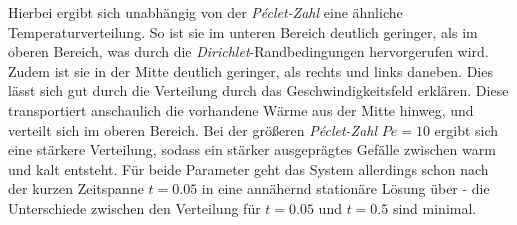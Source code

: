 \documentclass[12pt,a4paper,titlepage,headinclude,bibtotoc]{scrartcl}
\begin{document}
Hierbei ergibt sich unabhängig von der \textit{Péclet-Zahl} eine ähnliche Temperaturverteilung. So ist sie im unteren Bereich deutlich geringer, als im oberen Bereich, was durch die \textit{Dirichlet}-Randbedingungen hervorgerufen wird. Zudem ist sie in der Mitte deutlich geringer, als rechts und links daneben. Dies lässt sich gut durch die Verteilung durch das Geschwindigkeitsfeld erklären. Diese transportiert anschaulich die vorhandene Wärme aus der Mitte hinweg, und verteilt sich im oberen Bereich. Bei der größeren \textit{Péclet-Zahl} $Pe=10$ ergibt sich eine stärkere Verteilung, sodass ein stärker ausgeprägtes Gefälle zwischen warm und kalt entsteht. Für beide Parameter geht das System allerdings schon nach der kurzen Zeitspanne $t = 0.05$ in eine annähernd stationäre Lösung über - die Unterschiede zwischen den Verteilung für $t=0.05$ und $t=0.5$ sind minimal. 
\end{document}
